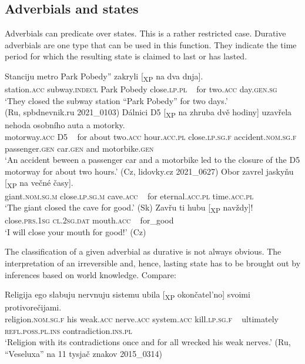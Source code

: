 \documentclass[output=paper]{langscibook}
\begin{document}
\subsection{Adverbials and states}
\label{sec:junghanns:3.2}

Adverbials can predicate over states. This is a rather restricted case. Durative adverbials are one type that can be used in this function. They indicate the time period for which the resulting state is claimed to last or has lasted.

\ea%
    \label{ex:junghanns:43}
\gll Stanciju metro  Park Pobedy” zakryli [\textsubscript{XP} na dva dnja].\\
  station.\textsc{acc} subway.\textsc{indecl} {} Park Pobedy close.\textsc{lp.pl} ~ for two.\textsc{acc} day.\textsc{gen.sg}\\
    \glt ‘They closed the subway station “Park Pobedy” for two days.’ \\ \hfill(Ru, spbdnevnik.ru 2021\_0103)
\ex%
    \label{ex:junghanns:44}
\gll Dálnici D5 [\textsubscript{XP} na zhruba dvě hodiny] uzavřela nehoda osobního auta a motorky.\\
  motorway.\textsc{acc} D5 ~ for about two.\textsc{acc} hour.\textsc{acc.pl} close.\textsc{lp.sg.f} accident.\textsc{nom.sg.f} passenger.\textsc{gen} car.\textsc{gen} and motorbike.\textsc{gen}\\
    \glt ‘An accident beween a passenger car and a motorbike led to the closure of the D5 motorway for about two hours.’ \hfill(Cz, lidovky.cz 2021\_0627)
\ex%
    \label{ex:junghanns:45}
\gll Obor zavrel jaskyňu   [\textsubscript{XP} na večné časy].\\
  giant.\textsc{nom.sg.m} close.\textsc{lp.sg.m} cave.\textsc{acc} ~ for eternal.\textsc{acc.pl} time.\textsc{acc.pl}\\
    \glt ‘The giant closed the cave for good.’ \hfill (Sk)
\ex%
    \label{ex:junghanns:46}
\gll Zavřu ti hubu [\textsubscript{XP} navždy]!\\
  close.\textsc{prs.1sg} \textsc{cl.2sg.dat} mouth.\textsc{acc} ~ for\_good\\
    \glt ‘I will close your mouth for good!’ \hfill (Cz)
\z

\noindent The classification of a given adverbial as durative is not always obvious. The interpretation of an irreversible and, hence, lasting state has to be brought out by inferences based on world knowledge. Compare:

\ea%
    \label{ex:junghanns:47}
\gll Religija ego slabuju nervnuju sistemu ubila [\textsubscript{XP} okončatel’no] svoimi protivorečijami.\\
  religion.\textsc{nom.sg.f} his weak.\textsc{acc} nerve.\textsc{acc} system.\textsc{acc} kill.\textsc{lp.sg.f} ~ ultimately \textsc{refl.poss.pl.ins} contradiction.\textsc{ins.pl}\\
    \glt ‘Religion with its contradictions once and for all wrecked his weak nerves.’ \hfill (Ru, “Veseluxa” na 11 tysjač znakov 2015\_0314)
\z
\end{document}
